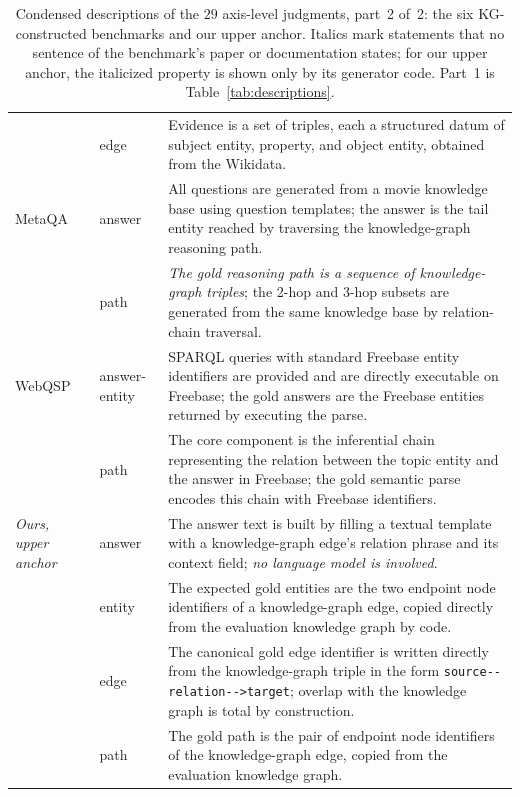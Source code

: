 \documentclass[11pt]{article}
\begin{document}
\begin{table}[tp]
\begin{tabular}{@{}p{}p{}p{}@{}}
 & edge & Evidence is a set of triples, each a structured datum of subject entity, property, and object entity, obtained from the Wikidata.\tabularnewline
\addlinespace[1.5pt]
\raggedright MetaQA & answer & All questions are generated from a movie knowledge base using question templates; the answer is the tail entity reached by traversing the knowledge-graph reasoning path.\tabularnewline
 & path & \emph{The gold reasoning path is a sequence of knowledge-graph triples}; the 2-hop and 3-hop subsets are generated from the same knowledge base by relation-chain traversal.\tabularnewline
\addlinespace[1.5pt]
\raggedright WebQSP & answer-entity & SPARQL queries with standard Freebase entity identifiers are provided and are directly executable on Freebase; the gold answers are the Freebase entities returned by executing the parse.\tabularnewline
 & path & The core component is the inferential chain representing the relation between the topic entity and the answer in Freebase; the gold semantic parse encodes this chain with Freebase identifiers.\tabularnewline
\addlinespace[1.5pt]
\raggedright \textit{Ours, upper anchor} & answer & The answer text is built by filling a textual template with a knowledge-graph edge's relation phrase and its context field; \emph{no language model is involved}.\tabularnewline
 & entity & The expected gold entities are the two endpoint node identifiers of a knowledge-graph edge, copied directly from the evaluation knowledge graph by code.\tabularnewline
 & edge & The canonical gold edge identifier is written directly from the knowledge-graph triple in the form \texttt{source-{}-relation-{}->target}; overlap with the knowledge graph is total by construction.\tabularnewline
 & path & The gold path is the pair of endpoint node identifiers of the knowledge-graph edge, copied from the evaluation knowledge graph.\tabularnewline
\bottomrule
\end{tabular}
\caption{Condensed descriptions of the $29$ axis-level judgments, part~2 of~2: the six KG-constructed benchmarks and our upper anchor. Italics mark statements that no sentence of the benchmark's paper or documentation states; for our upper anchor, the italicized property is shown only by its generator code. Part~1 is Table~\ref{tab:descriptions}.}
\label{tab:descriptions2}
\end{table}
\end{document}
